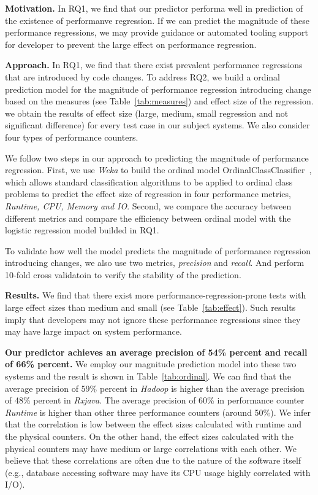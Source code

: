  \textbf{Motivation.}
In RQ1, we find that our predictor performa well in prediction of the existence of performanve regression. If we can predict the magnitude of these performance regressions, we may provide guidance or automated tooling support for developer to prevent the large effect on performance regression.

\textbf{Approach.}
In RQ1, we find that there exist prevalent performance regressions that are introduced by code changes. To address RQ2, we build a ordinal prediction model for the magnitude of performance regression introducing change based on the measures (see Table~\ref{tab:measures}) and effect size of the regression. we obtain the results of effect size (large, medium, small regression and not significant difference) for every test case in our subject systems. We also consider four types of performance counters.

We follow two steps in our approach to predicting the magnitude of performance regression. First, we use \emph{Weka} to build the ordinal model OrdinalClassClassifier~\cite{Frank2001}, which allows standard classification algorithms to be applied to ordinal class problems to predict the effect size of regression in four performance metrics, \emph{Runtime, CPU, Memory and IO}. Second, we compare the accuracy between different metrics and compare the efficiency between ordinal model with the logistic regression model builded in RQ1. 

To validate how well the model predicts the magnitude of performance regression introducing changes, we also use two metrics, \emph{precision} and \emph{recall}. And perform 10-fold cross validatoin to verify the stability of the prediction.

\textbf{Results.} We find that there exist more performance-regression-prone tests with large effect sizes than medium and small (see Table~\ref{tab:effect}). Such results imply that developers may not ignore these performance regressions since they may have large impact on system performance.

\textbf{Our predictor achieves an average precision of 54\% percent and recall of 66\% percent.} We employ our magnitude prediction model into these two systems and the result is shown in Table~\ref{tab:ordinal}. We can find that the average precision of 59\% percent in \emph{Hadoop} is higher than the average precision of 48\% percent in \emph{Rxjava}. The average precision of 60\% in performance counter \emph{Runtime} is higher than other three performance counters (around 50\%).  We infer that the correlation is low between the effect sizes calculated with runtime and the physical counters. On the other hand, the effect sizes calculated with the physical counters may have medium or large correlations with each other. We believe that these correlations are often due to the nature of the software itself (e.g., database accessing software may have its CPU usage highly correlated with I/O).

